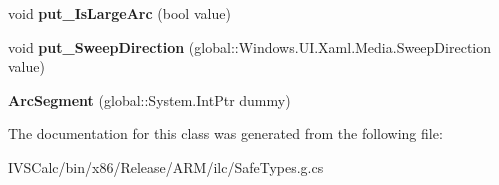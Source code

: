 \begin{DoxyCompactItemize}
void {\bfseries put\+\_\+\+Is\+Large\+Arc} (bool value)
\item 
\mbox{\label{class_windows_1_1_u_i_1_1_xaml_1_1_media_1_1_arc_segment_a82728182889ceaef7ff54beab34e9b94}} 
void {\bfseries put\+\_\+\+Sweep\+Direction} (global\+::\+Windows.\+U\+I.\+Xaml.\+Media.\+Sweep\+Direction value)
\item 
\mbox{\label{class_windows_1_1_u_i_1_1_xaml_1_1_media_1_1_arc_segment_a429457ddfea0ab424e587c2be0398db2}} 
{\bfseries Arc\+Segment} (global\+::\+System.\+Int\+Ptr dummy)
\end{DoxyCompactItemize}


The documentation for this class was generated from the following file\+:\begin{DoxyCompactItemize}
\item 
I\+V\+S\+Calc/bin/x86/\+Release/\+A\+R\+M/ilc/Safe\+Types.\+g.\+cs\end{DoxyCompactItemize}

